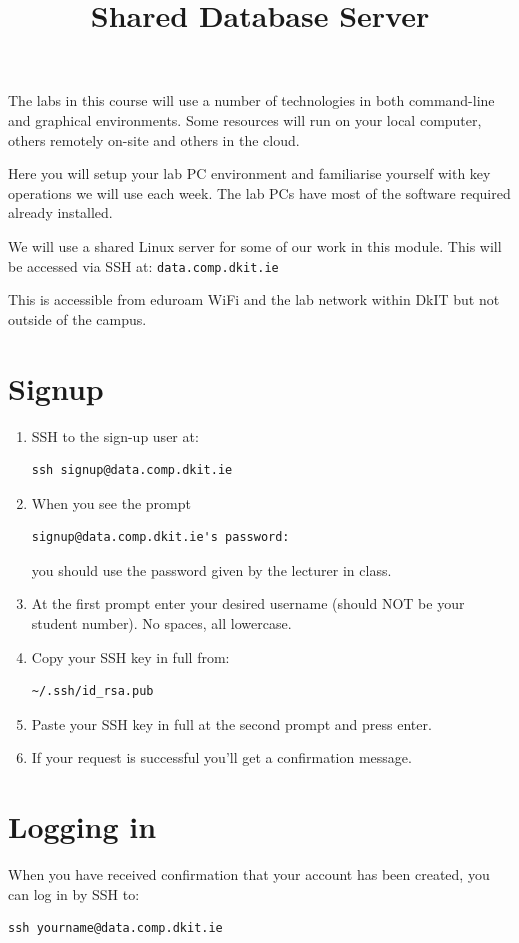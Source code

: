 \documentclass{pgnotes}
\title{Shared Database Server}
\begin{document}
\maketitle


The labs in this course will use a number of technologies in both command-line and graphical environments.
Some resources will run on your local computer, others remotely on-site and others in the cloud.

Here you will setup your lab PC environment and familiarise yourself with key operations we will use each week.
The lab PCs have most of the software required already installed.


We will use a shared Linux server for some of our work in this module.
This will be accessed via SSH at:
\texttt{data.comp.dkit.ie}

This is accessible from eduroam WiFi and the lab network within DkIT but not outside of the campus.

\section{Signup}

\begin{enumerate}

\item SSH to the sign-up user at:
\begin{verbatim}
ssh signup@data.comp.dkit.ie
\end{verbatim}

\item When you see the prompt
\begin{verbatim}
signup@data.comp.dkit.ie's password: 
\end{verbatim}
  you should use the password given by the lecturer in class.

\item At the first prompt enter your desired username (should NOT be your student number).
  No spaces, all lowercase.

\item Copy your SSH key in full from:
\begin{verbatim}
~/.ssh/id_rsa.pub
\end{verbatim}
  
\item Paste your SSH key in full at the second prompt and press enter.

\item If your request is successful you'll get a confirmation message.
  
\end{enumerate}

\section{Logging in}

When you have received confirmation that your account has been created, you can log in by SSH to:
\begin{verbatim}
ssh yourname@data.comp.dkit.ie
\end{verbatim}
\end{document}
